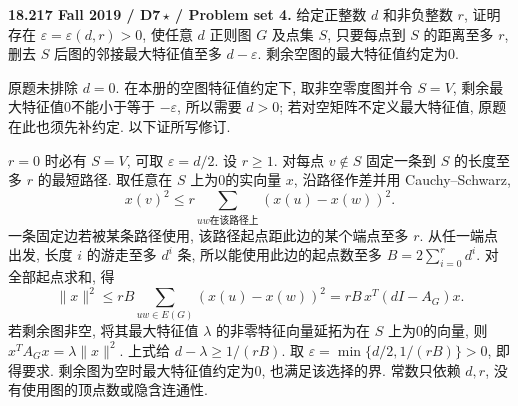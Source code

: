 \begin{exercise}\label{mit:18217-d7}
\textbf{18.217 Fall 2019 / D7\,$\star$ / Problem set 4.}
给定正整数 $d$ 和非负整数 $r$, 证明存在 $\varepsilon=\varepsilon(d,r)>0$, 使任意 $d$ 正则图 $G$ 及点集 $S$, 只要每点到 $S$ 的距离至多 $r$, 删去 $S$ 后图的邻接最大特征值至多 $d-\varepsilon$. 剩余空图的最大特征值约定为0.
\end{exercise}
\begin{solution}
原题未排除 $d=0$. 在本册的空图特征值约定下, 取非空零度图并令 $S=V$, 剩余最大特征值0不能小于等于 $-\varepsilon$, 所以需要 $d>0$; 若对空矩阵不定义最大特征值, 原题在此也须先补约定. 以下证所写修订.

$r=0$ 时必有 $S=V$, 可取 $\varepsilon=d/2$. 设 $r\ge1$. 对每点 $v\notin S$ 固定一条到 $S$ 的长度至多 $r$ 的最短路径. 取任意在 $S$ 上为0的实向量 $x$, 沿路径作差并用 Cauchy--Schwarz,
\[
x(v)^2\le r\sum_{uw\text{在该路径上}}(x(u)-x(w))^2.
\]
一条固定边若被某条路径使用, 该路径起点距此边的某个端点至多 $r$. 从任一端点出发, 长度 $i$ 的游走至多 $d^i$ 条, 所以能使用此边的起点数至多
$B=2\sum_{i=0}^rd^i$.
对全部起点求和, 得
\[
\|x\|^2\le rB\sum_{uw\in E(G)}(x(u)-x(w))^2
=rB\,x^T(dI-A_G)x.
\]
若剩余图非空, 将其最大特征值 $\lambda$ 的非零特征向量延拓为在 $S$ 上为0的向量, 则 $x^TA_Gx=\lambda\|x\|^2$. 上式给
$d-\lambda\ge1/(rB)$.
取 $\varepsilon=\min\{d/2,1/(rB)\}>0$, 即得要求. 剩余图为空时最大特征值约定为0, 也满足该选择的界. 常数只依赖 $d,r$, 没有使用图的顶点数或隐含连通性.
\end{solution}
